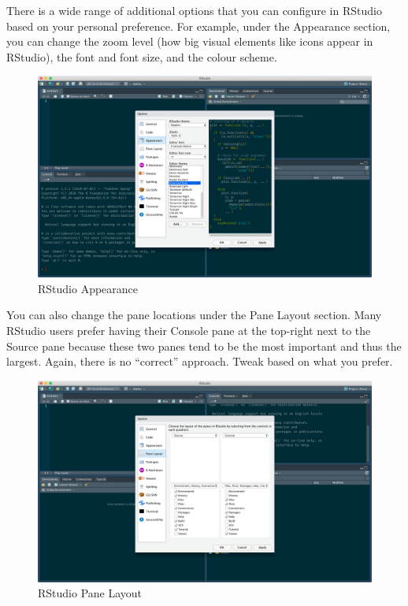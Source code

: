 \documentclass[
]{article}
\begin{document}
There is a wide range of additional options that you can configure in
RStudio based on your personal preference. For example, under the
Appearance section, you can change the zoom level (how big visual
elements like icons appear in RStudio), the font and font size, and the
colour scheme.

\begin{figure}
\centering
\includegraphics{screenshots/appearance.png}
\caption{RStudio Appearance}
\end{figure}

You can also change the pane locations under the Pane Layout section.
Many RStudio users prefer having their Console pane at the top-right
next to the Source pane because these two panes tend to be the most
important and thus the largest. Again, there is no ``correct'' approach.
Tweak based on what you prefer.

\begin{figure}
\centering
\includegraphics{screenshots/layout.png}
\caption{RStudio Pane Layout}
\end{figure}
\end{document}
